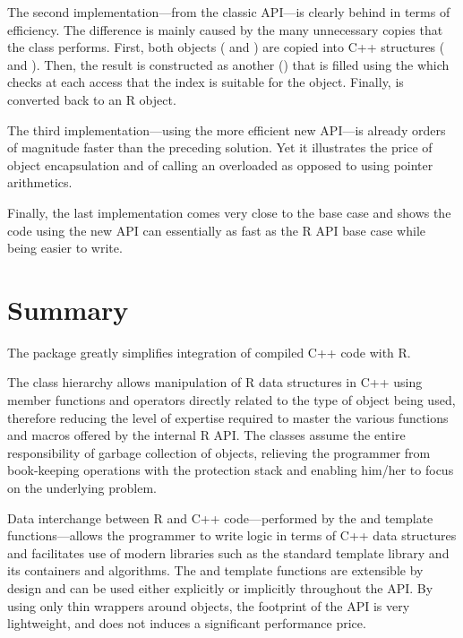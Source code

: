 The second implementation---from the classic  API---is
clearly behind in terms of efficiency. The difference is mainly 
caused by the many unnecessary copies that the 
class performs. First, both objects ( and )
are copied into C++ structures ( and ). 
Then, the result is constructed as another 
() that is filled using the  which checks
at each access that the index is suitable for the object. Finally, 
is converted back to an R object. 

The third implementation---using the more efficient new  API---is
already orders of magnitude faster than the preceding solution. Yet it
illustrates the price of object encapsulation and of calling an overloaded
 as opposed to using pointer arithmetics.

Finally, the last implementation comes very close to the base case and shows
the code using the new API can essentially as fast as the R API base case
while being easier to write. 


\section{Summary}

The  package greatly simplifies integration of compiled C++ code
with R. 

The class hierarchy allows manipulation of R data structures in C++ 
using member functions and operators directly related to the type
of object being used, therefore reducing the level of expertise
required to master the various functions and macros offered by the
internal R API. The classes assume the entire 
responsibility of garbage collection of objects, relieving the 
programmer from book-keeping operations with the protection stack 
and enabling him/her to focus on the underlying problem. 

Data interchange between R and C++ code---performed by the  and
 template functions---allows the programmer to write logic in terms
of C++ data structures and facilitates use of modern libraries such as the
standard template library and its containers and algorithms. The
 and  template functions are extensible by design and
can be used either explicitly or implicitly throughout the API.
By using only thin wrappers around  objects, 
the footprint of the  API is very lightweight, and does not 
induces a significant performance price. 

